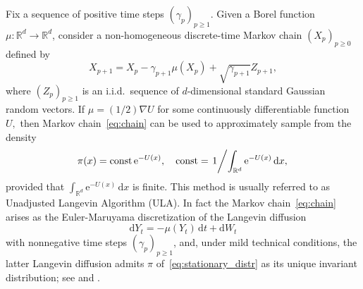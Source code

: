 \documentclass[article]{elsarticle}
\def\rmd{\mathrm{d}}
\def\rme{\mathrm{e}}
\begin{document}
\begin{example}
\label{exam:langevin-algorithm}
Fix a sequence of positive time steps \((\gamma_p)_{p\geq 1}.\) Given a Borel function $\mu\colon\mathbb{R}^{d}\to\mathbb{R}^{d}$,
consider a non-homogeneous
discrete-time Markov chain $(X_{p})_{p\geq0}$ defined by
\begin{equation}\label{eq:chain}
X_{p+1}=X_{p}-\gamma_{p+1}\mu(X_{p})+\sqrt{\gamma_{p+1}}Z_{p+1},\end{equation}
where $\left(Z_{p}\right)_{p\geq1}$ is an i.i.d.\ sequence of $d$-dimensional
standard Gaussian random vectors. If
${\mu=(1/2)\nabla U}$
for some continuously differentiable function $U,$ then Markov chain~\eqref{eq:chain} can be used to approximately sample from the density
\begin{equation}\label{eq:stationary_distr}
\pi(x)= \mathrm{const}\,\rme^{-U(x)}, \quad \mathrm{const}= \left. 1 \middle /{\int_{\mathbb{R}^{d}} \rme^{-U(x)}\, \rmd x,} \right.
\end{equation}
provided that \(\int_{\mathbb{R}^{d}} \rme^{-U(x)}\,\rmd x\) is finite. This method is usually referred to as
Unadjusted Langevin Algorithm (ULA).
In fact the Markov chain~\eqref{eq:chain}
arises as the Euler-Maruyama discretization
of the Langevin diffusion
\[
\rmd Y_t=-\mu(Y_t)\,\rmd t+ \rmd W_t
\]
with nonnegative time steps $(\gamma_p)_{p\ge1}$,
and,  under mild technical conditions, the latter Langevin diffusion admits $\pi$
of~\eqref{eq:stationary_distr}
as its unique invariant distribution; see \cite{dalalyan2017theoretical} and \cite{durmus:moulines:2017}.
\end{example}
\end{document}
